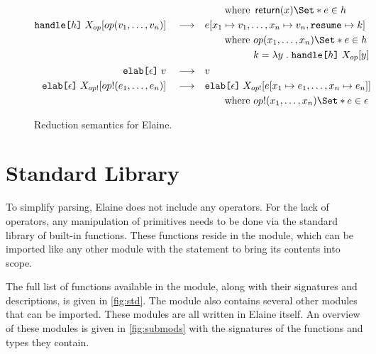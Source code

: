 \begin{figure}[p]
\begin{align*}
    &\qquad\text{where } \return(x) \S{ e } \in h\\
    \kw{handle}\tok{[}h\tok{]}\;X_{op}[op(v_1, \dots, v_n)] \reduce& e[x_1\mapsto v_1, \dots, x_n\mapsto v_n, \kw{resume} \mapsto k] \\
    &\qquad \text{where } \begin{aligned}[t]
        & op(x_1, \dots, x_n) \S{e} \in h\\
        & k = \lam{y}{\kw{handle}\tok{[}h\tok{]}\;
        X_{op}[y]}
    \end{aligned}\\
    \kw{elab}\tok{[}\epsilon\tok{]}\;v \reduce& v\\
    \kw{elab}\tok{[}\epsilon\tok{]}\;X_{op!}[op!(e_1, \dots, e_n)] \reduce& \kw{elab}\tok{[}\epsilon\tok{]}\;X_{op!}[e[x_1 \mapsto e_1, \dots, x_n \mapsto e_n]] \\
    &\qquad \text{where } op!(x_1, \dots, x_n) \S{e} \in \epsilon \\
\end{align*}
\caption{Reduction semantics for Elaine.}
\label{fig:reductionsemantics}
\end{figure}

\section{Standard Library}\label{sec:std}

To simplify parsing, Elaine does not include any operators. For the lack of operators, any manipulation of primitives needs to be done via the standard library of built-in functions. These functions reside in the  module, which can be imported like any other module with the  statement to bring its contents into scope.

The full list of functions available in the  module, along with their signatures and descriptions, is given in \cref{fig:std}. The  module also contains several other modules that can be imported. These modules are all written in Elaine itself. An overview of these modules is given in \cref{fig:submods} with the signatures of the functions and types they contain.

